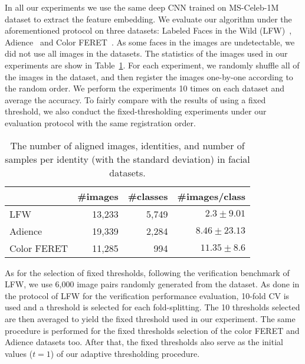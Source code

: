 \documentclass[10pt,twocolumn]{article}
\begin{document}
In all our experiments we use the same deep CNN trained on MS-Celeb-1M~\cite{guo2016msceleb} dataset to extract the feature embedding. We evaluate our algorithm under the aforementioned protocol on three datasets: Labeled Faces in the Wild (LFW)~\cite{huang2008labeled}, Adience~\cite{eidinger2014age} and Color FERET~\cite{phillips2000feret}. As some faces in the images are undetectable, we did not use all images in the datasets. The statistics of the images used in our experiments are show in Table~\ref{tab:dataset-info}. For each experiment, we randomly shuffle all of the images in the dataset, and then register the images one-by-one according to the random order. We perform the experiments 10 times on each dataset and average the accuracy. To fairly compare with the results of using a fixed threshold, we also conduct the fixed-thresholding experiments under our evaluation protocol with the same registration order.

\begin{table}[t]
\centering
\caption{The number of aligned images, identities, and number of samples per identity (with the standard deviation) in facial datasets.} \label{tab:dataset-info}
\begin{tabular}{lrrr}
\toprule
           &\#images & \#classes & \#images/class\\ \midrule
LFW         & 13,233 & 5,749 & $2.3\pm9.01$\\ 
Adience     & 19,339 & 2,284 & $8.46\pm23.13$\\ 
Color FERET & 11,285 & 994   & $11.35\pm8.6$\\ \midrule
\end{tabular}
\end{table}

As for the selection of fixed thresholds, following the verification benchmark of LFW, we use 6,000 image pairs randomly generated from the dataset. As done in the protocol of LFW for the verification performance evaluation, 10-fold CV is used and a threshold is selected for each fold-splitting. The 10 thresholds selected are then averaged to yield the fixed threshold used in our experiment. The same procedure is performed for the fixed thresholds selection of the color FERET and Adience datasets too.
After that, the fixed thresholds also serve as the initial values ($t=1$) of our adaptive thresholding procedure.
\end{document}
